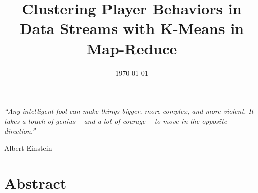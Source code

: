 \documentclass[a4paper, 11pt, oneside]{Thesis}  %
\begin{document}
\frontmatter	  %

\title  {Clustering Player Behaviors in Data Streams with K-Means in Map-Reduce}
\addresses  {\groupname\\\deptname\\\univname}  %
\date       {\today}
\subject    {}
\keywords   {}

\maketitle


\fancyhead{}  %
\rhead{\thepage}  %
\lhead{}  %

\pagestyle{fancy}  %


\pagestyle{empty}  %

\null\vfill
\textit{``Any intelligent fool can make things bigger, more complex, and more violent. It takes a touch of genius -- and a lot of courage -- to move in the opposite direction.''}

\begin{flushright}
Albert Einstein
\end{flushright}

\vfill\vfill\vfill\vfill\vfill\vfill\null
\clearpage  %

\chapter*{Abstract}
\thispagestyle{plain}
\end{document}
